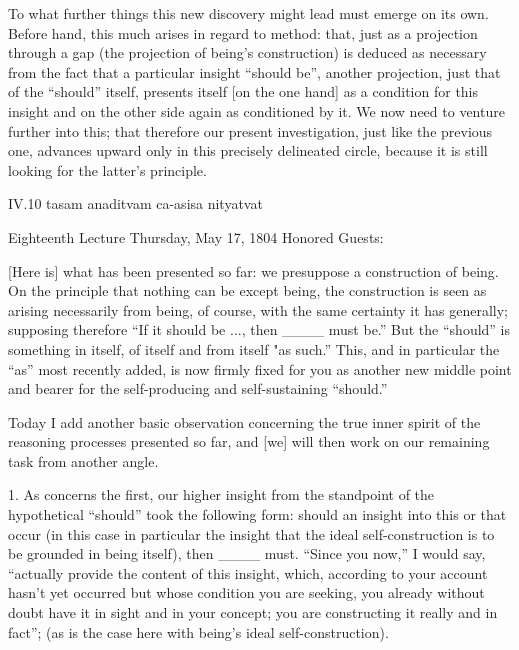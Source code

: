 To what further things this new discovery
might lead must emerge on its own.
Before hand, this much arises in regard to method:
that, just as a projection through a gap
(the projection of being's construction)
is deduced as necessary from the fact
that a particular insight “should be”,
another projection, just that of the “should” itself,
presents itself [on the one hand] as
a condition for this insight
and on the other side again as conditioned by it.
We now need to venture further into this;
that therefore our present investigation,
just like the previous one,
advances upward only in this
precisely delineated circle,
because it is still looking
for the latter's principle.

IV.10
tasam anaditvam ca-asisa nityatvat

Eighteenth Lecture
Thursday, May 17, 1804
Honored Guests:

[Here is] what has been presented so far:
we presuppose a construction of being.
On the principle that nothing can be except being,
the construction is seen as arising necessarily from being,
of course, with the same certainty it has generally;
supposing therefore “If it should be ..., then ____ must be.”
But the “should” is something in itself, of itself and from itself "as such.”
This, and in particular the “as” most recently added,
is now firmly fixed for you as another new middle point
and bearer for the self-producing and self-sustaining “should.”

Today I add another basic observation
concerning the true inner spirit of
the reasoning processes presented so far,
and [we] will then work on
our remaining task from another angle.

1. As concerns the first,
our higher insight from the standpoint of
the hypothetical “should” took the following form:
should an insight into this or that occur
(in this case in particular the insight that
the ideal self-construction is to be grounded in being itself),
then ____ must.
“Since you now,” I would say,
“actually provide the content of this insight,
which, according to your account hasn't yet occurred
but whose condition you are seeking,
you already without doubt have it
in sight and in your concept;
you are constructing it really and in fact”;
(as is the case here with being's ideal self-construction).

